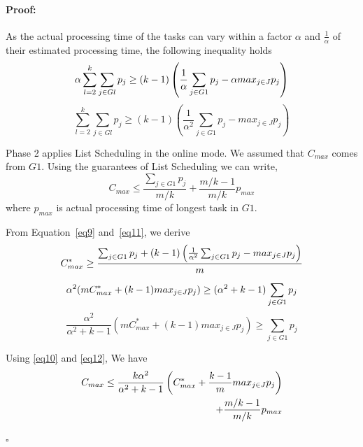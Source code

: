 \documentclass[12pt]{article}
\theoremstyle{mystyle}
\newenvironment{myproof}{\paragraph{Proof:}}{\hfill$\square$}
\begin{document}
\begin{myproof}
      As the actual processing time of the tasks can vary within a factor
      $\alpha$ and $\frac{1}{\alpha}$ of their estimated processing time,
      the following inequality holds
      \begin{equation}{\nonumber}
        \alpha\sum_{l=2}^{k}\sum_{j \in Gl }^{}{{p_{j}}} \geq (k-1) \left( \frac{1}{\alpha}\sum_{j \in G1 }^{}{{p_{j}}}- \alpha {max_{j \in J}}{{p_{j}}} \right)
      \end{equation}
      \begin{equation}\label{eq9}
        \sum_{l=2}^{k}\sum_{j \in Gl }^{}{{p_{j}}} \geq (k-1) \left(\frac{1}{\alpha^{2}}\sum_{j \in G1 }^{}{{p_{j}}}-  {max_{j \in J}}{{p_{j}}} \right)
      \end{equation}
    
      Phase 2 applies List Scheduling in the online mode. We assumed that
      $C_{max}$ comes from $G1$. Using the guarantees of List Scheduling
      we can write,
      \begin{equation}\label{eq10}
        C_{max} \leq \frac{\sum_{j \in G1 }^{}{{p_{j}}}}{m/k} + {\frac{m/k-1}{m/k}} p_{max}
      \end{equation}
      where $p_{max}$ is actual processing time of longest task in $G1$.
    
      From Equation~\ref{eq9} and~\ref{eq11}, we derive
      \begin{equation}{\nonumber}
        C_{max}^{*} \geq  \frac{\sum_{j \in G1 }^{}{{p_{j}}}+ (k-1)\left(\frac{1}{\alpha^{2}}\sum_{j \in G1 }^{}{{p_{j}}}-  {max_{j \in J}}{{p_{j}}}\right)}{m}
      \end{equation}
      \begin{equation}{\nonumber}
        \alpha^{2} (mC_{max}^{*} + (k-1){max_{j \in J}}{{p_{j}}}) \geq  (\alpha^{2} + k-1) \sum_{j \in G1 }^{}{{p_{j}}}  
      \end{equation}
      \begin{equation}\label{eq12}
        \frac{\alpha^{2}}{\alpha^{2}+k-1}\left(m C_{max}^{*}+(k-1) {max_{j \in J}}{{p_{j}}}\right) \geq \sum_{j \in G1 }^{}{{p_{j}}}  
      \end{equation}
      
      Using \ref{eq10} and \ref{eq12}, We have
      \begin{align}{\nonumber}
        C_{max} \leq \frac{k\alpha^{2}}{\alpha^{2}+k-1}\left( C_{max}^{*}+\frac{k-1}{m} {max_{j \in J}}{{p_{j}}}\right)\\
        + {\frac{m/k-1}{m/k}} p_{max} \nonumber
      \end{align}
      

\end{myproof}
\end{document}
